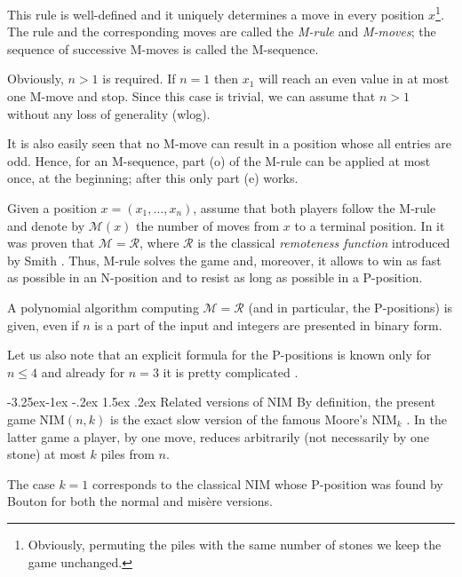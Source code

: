 \documentclass[10pt]{article}
\makeatletter
\renewcommand\subsection{\@startsection{subsection}{2}{\z@}
{-3.25ex\@plus -1ex \@minus -.2ex}
{1.5ex \@plus .2ex}
{\normalfont\normalsize\bfseries\boldmath}}
\theoremstyle{definition}
\def\R{\mathcal{R}}
\def\M{\mathcal{M}}
\makeatother
\begin{document}
This rule is well-defined and it uniquely determines 
a move in every position $x$\footnote{Obviously, permuting the piles 
with the same number of stones we keep the game unchanged.}. 
The rule and the corresponding moves 
are called the {\em M-rule} and {\em M-moves};  
the sequence of successive M-moves 
is called the {M-sequence}.

Obviously,  $n > 1$ is required. 
If  $n=1$  then  $x_1$  will reach 
an even value in at most one M-move and stop. 
Since this case is trivial, 
we can assume that  $n > 1$  
without any loss of generality (wlog). 

It is also easily seen that 
no M-move can result in a position whose all entries are odd.  
Hence, for an M-sequence,  part (o) of the M-rule 
can be applied at most once, at the beginning; 
after this only part (e) works. 

Given a position  $x = (x_1, \ldots, x_n)$, 
assume that both players follow the M-rule 
and  denote by $\M(x)$  the number of moves 
from  $x$  to a terminal position. 
In \cite{GMMV23} it was proven that  $\M = \R$, where 
$\R$  is the classical {\em remoteness function} 
introduced by Smith \cite{Smi66}. 
Thus, M-rule solves the game and, moreover, 
it allows to win as fast as possible in an N-position and 
to resist as long as possible in a P-position.

A polynomial algorithm computing  $\M = \R$  
(and in particular, the P-positions) is given, 
even if $n$  is a part of the input and 
integers are presented in binary form.

Let us also note that 
an explicit formula for the P-positions is known 
only for $n \leq 4$  
and already for $n=3$ %
it is pretty complicated 
\cite{GHHC20}\cite[Appendix]{GMMV23}.

\subsection{Related versions of NIM} 
By definition, the present game NIM$(n,k)$ 
is the exact slow version  
of the famous Moore's NIM$_k$ \cite{Moo910}.  
In the latter game a player, by one move, 
reduces arbitrarily 
(not necessarily by one stone) 
at most $k$ piles from $n$. 

The case  $k=1$  corresponds to the classical NIM  
whose P-position was found by Bouton 
\cite{Bou901}  for both the normal and mis\`ere versions. 
\end{document}
